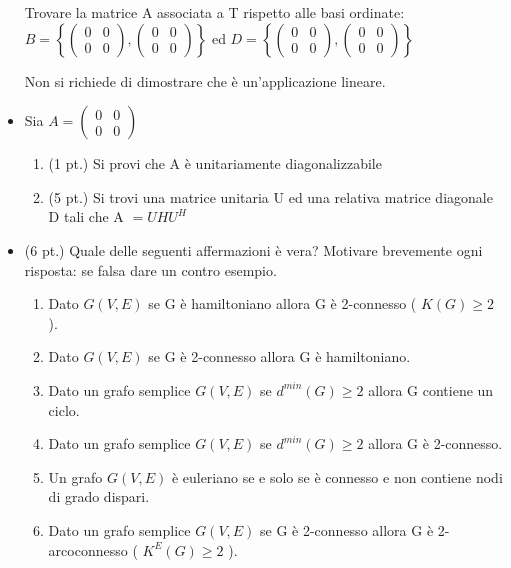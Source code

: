 \documentclass[12pt,a4paper]{article}
\begin{document}
\begin{itemize}[label=$\circ$]
    Trovare la matrice A associata a T rispetto alle basi ordinate: \\
    \(
        B = 
        \left\{ 
            \begin{pmatrix}
                0 & 0 \\
                0 & 0
            \end{pmatrix} 
            ,
            \begin{pmatrix}
                0 & 0 \\
                0 & 0
            \end{pmatrix}
        \right\}
    \)
        ed  
    \(
        D = 
        \left\{ 
            \begin{pmatrix}
                0 & 0 \\
                0 & 0
            \end{pmatrix} 
            ,
            \begin{pmatrix}
                0 & 0 \\
                0 & 0
            \end{pmatrix}
        \right\}
    \)

    Non si richiede di dimostrare che è un'applicazione lineare.

    \item Sia 
    \(
        A = 
        \begin{pmatrix}
            0 & 0 \\
            0 & 0
        \end{pmatrix}
    \)  
    \begin{enumerate}
        \item (1 pt.) Si provi che A è unitariamente diagonalizzabile
        \item (5 pt.) Si trovi una matrice unitaria U ed una relativa matrice diagonale D tali che A $=UHU^H$
    \end{enumerate}

    \item (6 pt.) Quale delle seguenti affermazioni è vera? Motivare brevemente ogni risposta: se falsa dare un contro esempio.
    \begin{enumerate}
        \item Dato \( G(V,E) \) se G è hamiltoniano allora G è 2-connesso ( \( K(G) \geq 2 \) ).
        \item Dato \( G(V,E) \) se G è 2-connesso allora G è hamiltoniano.
        \item Dato un grafo semplice \( G(V,E) \) se \(d^{min} (G) \geq 2 \) allora G contiene un ciclo. 
        \item Dato un grafo semplice \( G(V,E) \) se \(d^{min} (G) \geq 2 \) allora G è 2-connesso.
        \item Un grafo \( G(V,E) \) è euleriano se e solo se è connesso e non contiene nodi di grado dispari.
        \item  Dato un grafo semplice  \( G(V,E) \) se G è 2-connesso allora G è 2-arcoconnesso ( \( K^E(G) \geq 2 \) ).
    \end{enumerate}


\end{itemize}
\end{document}
